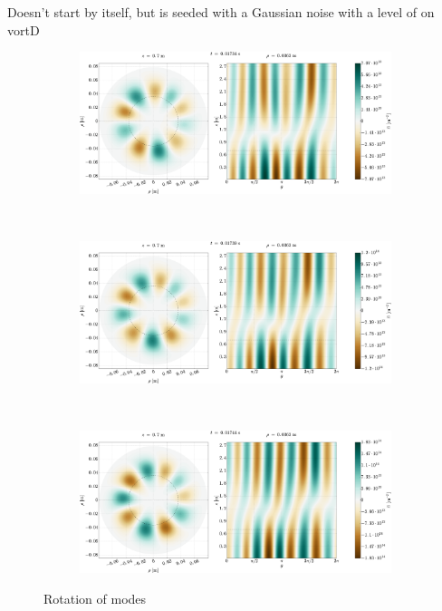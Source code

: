 Doesn't start by itself, but is seeded with a Gaussian noise with a level of on vortD
%
\begin{figure}[htbp]
    \centering
    \begin{subfigure}[h]{1.00\textwidth}
        \centering
        \includegraphics[width=1.0\textwidth]{fig/results/rotModes/n-perpPol-2D-fluct-0}
        \label{fig:rot1}
    \end{subfigure}%
    \\
    \begin{subfigure}[h]{1.00\textwidth}
        \centering
        \includegraphics[width=1.0\textwidth]{fig/results/rotModes/n-perpPol-2D-fluct-1}
        \label{fig:rot2}
    \end{subfigure}
    \\
    \begin{subfigure}[h]{1.00\textwidth}
        \centering
        \includegraphics[width=1.0\textwidth]{fig/results/rotModes/n-perpPol-2D-fluct-2}
        \label{fig:rot3}
    \end{subfigure}
    \caption{Rotation of modes}
\end{figure}
